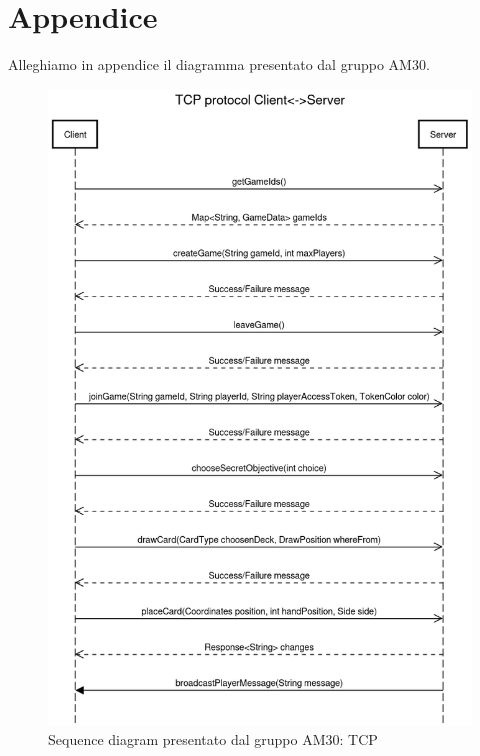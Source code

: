 \documentclass[12pt]{article}
\begin{document}
\newpage
\section{Appendice}
Alleghiamo in appendice il diagramma presentato dal gruppo AM30.
\begin{figure}[H]
    \begin{center}
        \includegraphics[scale=0.29]{AM30_TCPprotocol.png}
        \caption{Sequence diagram presentato dal gruppo AM30: TCP}
    \end{center}
\end{figure}
\end{document}
